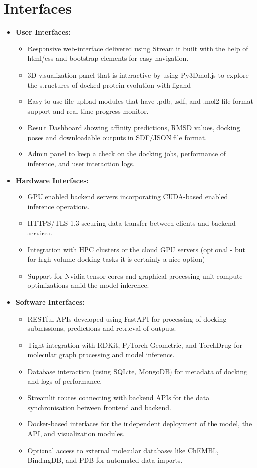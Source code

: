 \documentclass[12pt,a4]{report}
\begin{document}
\vspace{0.5cm}
\section{Interfaces}

\begin{itemize}
\item \textbf{User Interfaces:}
\begin{itemize}
\item Responsive web-interface delivered using Streamlit built with the help of html/css and bootstrap elements for easy navigation.
\item 3D visualization panel that is interactive by using Py3Dmol.js to explore the structures of docked protein evolution with ligand
\item Easy to use file upload modules that have .pdb, .sdf, and .mol2 file format support and real-time progress monitor.
\item Result Dashboard showing affinity predictions, RMSD values, docking poses and downloadable outputs in SDF/JSON file format.
\item Admin panel to keep a check on the docking jobs, performance of inference, and user interaction logs.
\end{itemize}

\item \textbf{Hardware Interfaces:}
\begin{itemize}
\item GPU enabled backend servers incorporating CUDA-based enabled inference operations.
\item HTTPS/TLS 1.3 securing data transfer between clients and backend services.
\item Integration with HPC clusters or the cloud GPU servers (optional - but for high volume docking tasks it is certainly a nice option)
\item Support for Nvidia tensor cores and graphical processing unit compute optimizations amid the model inference.
\end{itemize}

\item \textbf{Software Interfaces:}
\begin{itemize}
\item RESTful APIs developed using FastAPI for processing of docking submissions, predictions and retrieval of outputs.
\item Tight integration with RDKit, PyTorch Geometric, and TorchDrug for molecular graph processing and model inference.
\item Database interaction (using SQLite, MongoDB) for metadata of docking and logs of performance.
\item Streamlit routes connecting with backend APIs for the data synchronisation between frontend and backend.
\item Docker-based interfaces for the independent deployment of the model, the API, and visualization modules.
\item Optional access to external molecular databases like ChEMBL, BindingDB, and PDB for automated data imports.
\end{itemize}
\end{itemize}
\end{document}
